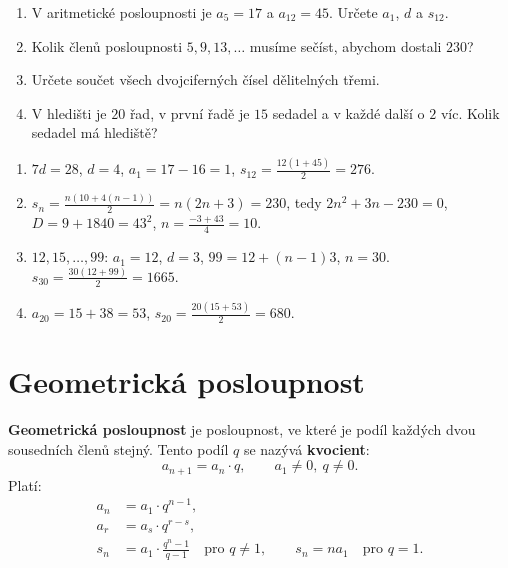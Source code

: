 \begin{problem}
  \begin{enumerate}[label=(\alph*)]
    \item V aritmetické posloupnosti je $a_5 = 17$ a $a_{12} = 45$. Určete $a_1$, $d$ a $s_{12}$.
    \item Kolik členů posloupnosti $5, 9, 13, \ldots$ musíme sečíst, abychom dostali $230$?
    \item Určete součet všech dvojciferných čísel dělitelných třemi.
    \item V hledišti je $20$ řad, v první řadě je $15$ sedadel a v každé další o $2$ víc. Kolik sedadel má hlediště?
  \end{enumerate}
\end{problem}

\begin{solution}
  \begin{enumerate}[label=(\alph*)]
    \item $7d = 28$, $d = 4$, $a_1 = 17 - 16 = 1$, $s_{12} = \frac{12(1 + 45)}{2} = 276$.
    \item $s_n = \frac{n(10 + 4(n - 1))}{2} = n(2n + 3) = 230$, tedy $2n^2 + 3n - 230 = 0$, $D = 9 + 1840 = 43^2$, $n = \frac{-3 + 43}{4} = 10$.
    \item $12, 15, \ldots, 99$: $a_1 = 12$, $d = 3$, $99 = 12 + (n - 1)3$, $n = 30$. $s_{30} = \frac{30(12 + 99)}{2} = 1665$.
    \item $a_{20} = 15 + 38 = 53$, $s_{20} = \frac{20(15 + 53)}{2} = 680$.
  \end{enumerate}
\end{solution}

\section{Geometrická posloupnost}\label{sec:geometricka-posloupnost}

\begin{definitionbox}
  \textbf{Geometrická posloupnost} je posloupnost, ve které je podíl každých dvou sousedních členů stejný. Tento podíl $q$ se nazývá \textbf{kvocient}:
  \begin{equation*}
    a_{n+1} = a_n\cdot q,\qquad a_1\neq 0,\ q\neq 0.
  \end{equation*}
  Platí:
  \begin{align*}
    a_n &= a_1\cdot q^{n-1},\\
    a_r &= a_s\cdot q^{r - s},\\
    s_n &= a_1\cdot\frac{q^n - 1}{q - 1}\quad\text{pro } q\neq 1,\qquad s_n = na_1\quad\text{pro } q = 1.
  \end{align*}
\end{definitionbox}

